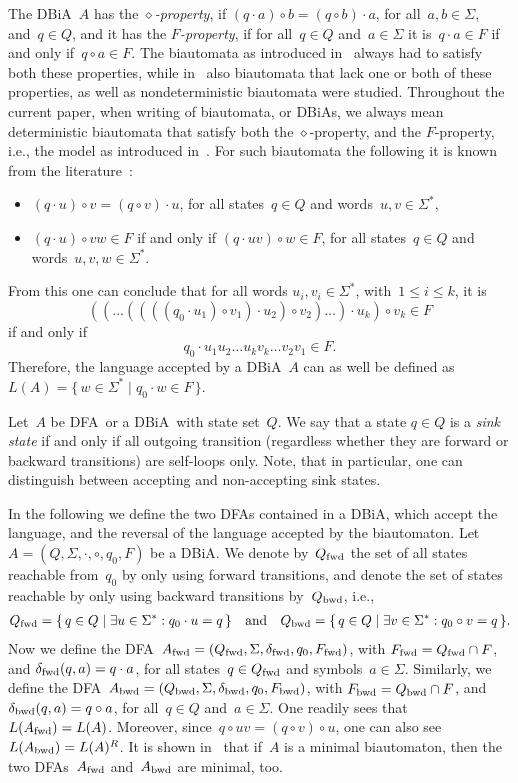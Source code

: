 \documentclass[submission]{eptcs}
\newcommand{\dfa}{\textrm{DFA}}
\newcommand{\dbia}{\textrm{DBiA}}
\newcommand{\fwd}{{\textnormal{fwd}}}
\newcommand{\bwd}{{\textnormal{bwd}}}
\begin{document}
The \dbia~$A$ has the \emph{$\diamond$-property}, if $(q\cdot a)\circ
b = (q\circ b)\cdot a$, for all~$a,b\in\Sigma$, and~$q\in Q$, and it
has the \emph{$F$-property}, if for all~$q\in Q$ and~$a\in\Sigma$ it
is~$q\cdot a \in F$ if and only if~$q\circ a \in F$.
The biautomata as introduced in~\cite{KlPo12} always had to satisfy
both these properties, while in~\cite{HoJa13c,HoJa13a} also biautomata
that lack one or both of these properties, as well as nondeterministic
biautomata were studied.
Throughout the current paper, when writing of biautomata, or \dbia s,
we always mean deterministic biautomata that satisfy both the
$\diamond$-property, and the $F$-property, i.e., the model as
introduced in~\cite{KlPo12}.
For such biautomata the following it is known from the
literature~\cite{HoJa13c,KlPo12}:
\begin{itemize}
\item $(q\cdot u)\circ v = (q\circ v)\cdot u$, for all states~$q\in Q$
  and words~$u,v\in\Sigma^*$,
\item $(q\cdot u)\circ vw \in F$ if and only if $(q\cdot uv)\circ w\in
  F$, for all states~$q\in Q$ and words~$u,v,w\in\Sigma^*$.
\end{itemize}
From this one can conclude that for all words $u_i,v_i\in\Sigma^*$,
with~$1\leq i\leq k$, it is 
\[((\dots((((q_0\cdot u_1)\circ v_1)\cdot u_2)\circ v_2)\dots)\cdot
u_k)\circ v_k \in F \]
if and only if
\[ q_0 \cdot u_1u_2\dots u_kv_k \dots v_2 v_1 \in F. \]
Therefore, the language accepted by a \dbia~$A$ can as well be defined
as $L(A) = \{\, w\in\Sigma^* \mid q_0\cdot w \in F\,\}$.

Let~$A$ be \dfa\ or a \dbia\ with state set~$Q$. We say that a state
$q\in Q$ is a \emph{sink state} if and only if all outgoing transition
(regardless whether they are forward or backward transitions) are
self-loops only. Note, that in particular, one can distinguish between
accepting and non-accepting sink states.

In the following we define the two \dfa s contained in a \dbia, which
accept the language, and the reversal of the language accepted by the
biautomaton.
Let $A=(Q,\Sigma,\cdot,\circ,q_0,F)$ be a \dbia.  We denote
by~$Q_\fwd$ the set of all states reachable from~$q_0$ by only using
forward transitions, and denote the set of states reachable by only
using backward transitions by~$Q_\bwd$, i.e.,
\begin{align*}
  Q_\fwd = \{\, q\in Q \mid \exists u\in\Sigma^*: q_0\cdot u = q\,\}\quad\mbox{and}\quad
  Q_\bwd = \{\, q\in Q \mid \exists v\in\Sigma^*: q_0\circ v = q\,\}.
\end{align*}
Now we define the \dfa\ $A_\fwd =
(Q_\fwd,\Sigma,\delta_\fwd,q_0,F_\fwd)$, with $F_\fwd = Q_\fwd \cap
F$, and $\delta_\fwd(q,a) = q\cdot a$, for all states~$q\in
Q_\fwd$ and symbols~$a\in\Sigma$.  Similarly, we define the \dfa\
$A_\bwd = (Q_\bwd,\Sigma,\delta_\bwd,q_0,F_\bwd)$, with $F_\bwd =
Q_\bwd \cap F$, and $\delta_\bwd(q,a)=q\circ a$, for all~$q\in Q$
and~$a\in\Sigma$.
One readily sees that~$L(A_\fwd)=L(A)$.  Moreover, since~$q\circ uv=
(q\circ v)\circ u$, one can also see~$L(A_\bwd)=L(A)^R$.
It is shown in~\cite{HoJa14} that if~$A$ is a minimal biautomaton,
then the two \dfa s~$A_\fwd$ and~$A_\bwd$ are minimal, too.
\end{document}
